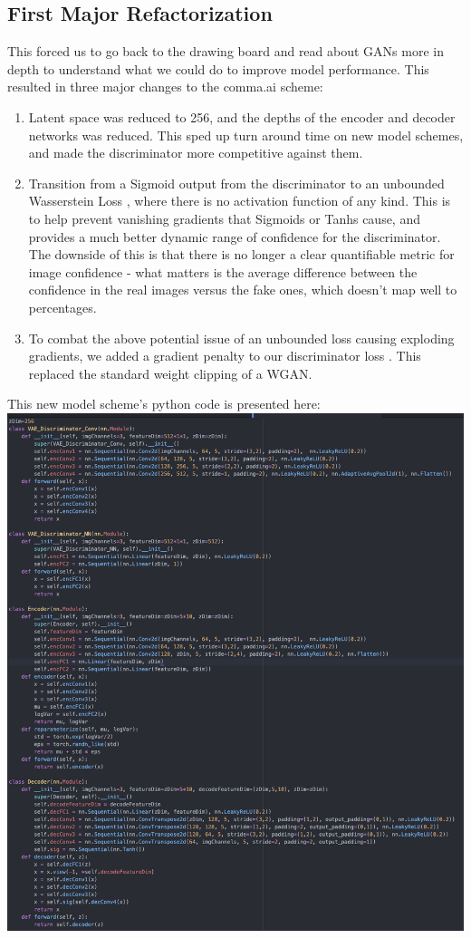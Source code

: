 \documentclass{article}
\begin{document}
\subsection{First Major Refactorization} 
This forced us to go back to the drawing board and read about GANs more in depth to understand what we could do to improve model performance. This resulted in three major changes to the comma.ai scheme: 
\begin{enumerate}
    \item Latent space was reduced to 256, and the depths of the encoder and decoder networks was reduced. This sped up turn around time on new model schemes, and made the discriminator more competitive against them.
    \item Transition from a Sigmoid output from the discriminator to an unbounded Wasserstein Loss \cite{arjovsky2017wasserstein}, where there is no activation function of any kind. This is to help prevent vanishing gradients that Sigmoids or Tanhs cause, and provides a much better dynamic range of confidence for the discriminator. The downside of this is that there is no longer a clear quantifiable metric for image confidence - what matters is the average difference between the confidence in the real images versus the fake ones, which doesn't map well to percentages. 
    \item To combat the above potential issue of an unbounded loss causing exploding gradients, we added a gradient penalty to our discriminator loss \cite{roth2017stabilizing}. This replaced the standard weight clipping of a WGAN.
\end{enumerate}
This new model scheme's python code is presented here: \\
\includegraphics[scale=0.5]{model1.png} \\
\end{document}
